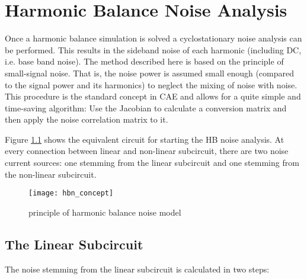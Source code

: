 %
%
%
%

\chapter{Harmonic Balance Noise Analysis}
\label{sec:hb_noise}

Once a harmonic balance simulation is solved a cyclostationary
noise analysis can
be performed. This results in the sideband noise of each harmonic
(including DC, i.e. base band noise). The method described here
is based on the principle of small-signal noise. That is, the
noise power is assumed small enough (compared to the signal power
and its harmonics) to neglect the mixing of noise with noise.
This procedure is the standard concept in CAE and allows for a
quite simple and time-saving algorithm: Use the Jacobian to
calculate a conversion matrix and then apply the noise correlation
matrix to it.

\addvspace{12pt}

Figure \ref{fig:hbn_concept} shows the equivalent circuit for
starting the HB noise analysis. At every connection between
linear and non-linear subcircuit, there are two noise current
sources: one stemming from the linear subcircuit and one
stemming from the non-linear subcircuit.

\begin{figure}[ht]
\begin{center}
\texttt{[image: hbn\_concept]}
\end{center}
\caption{principle of harmonic balance noise model}
\label{fig:hbn_concept}
\end{figure}
\FloatBarrier


\section{The Linear Subcircuit}

The noise stemming from the linear subcircuit is calculated
in two steps:

